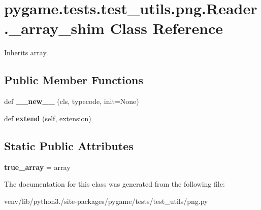 \hypertarget{classpygame_1_1tests_1_1test__utils_1_1png_1_1_reader_1_1__array__shim}{}\section{pygame.\+tests.\+test\+\_\+utils.\+png.\+Reader.\+\_\+array\+\_\+shim Class Reference}
\label{classpygame_1_1tests_1_1test__utils_1_1png_1_1_reader_1_1__array__shim}


Inherits array.

\subsection*{Public Member Functions}
\begin{DoxyCompactItemize}
\item 
\mbox{\label{classpygame_1_1tests_1_1test__utils_1_1png_1_1_reader_1_1__array__shim_a52dede9205ecea792f840f924ebad206}} 
def {\bfseries \+\_\+\+\_\+new\+\_\+\+\_\+} (cls, typecode, init=None)
\item 
\mbox{\label{classpygame_1_1tests_1_1test__utils_1_1png_1_1_reader_1_1__array__shim_a44b69e93ed1378f87d02ab1842ae1e3d}} 
def {\bfseries extend} (self, extension)
\end{DoxyCompactItemize}
\subsection*{Static Public Attributes}
\begin{DoxyCompactItemize}
\item 
\mbox{\label{classpygame_1_1tests_1_1test__utils_1_1png_1_1_reader_1_1__array__shim_a4a0c2c360b513092d34bd979d37d789f}} 
{\bfseries true\+\_\+array} = array
\end{DoxyCompactItemize}


The documentation for this class was generated from the following file\+:\begin{DoxyCompactItemize}
\item 
venv/lib/python3./site-\/packages/pygame/tests/test\+\_\+utils/png.\+py\end{DoxyCompactItemize}

